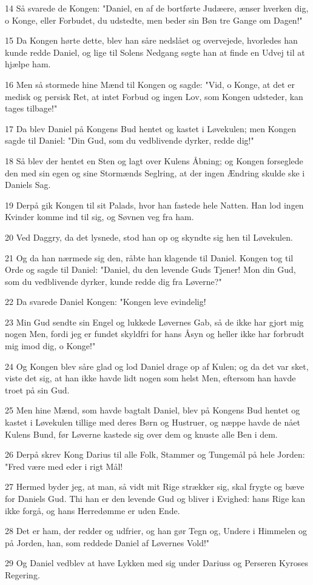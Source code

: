 \par 14 Så svarede de Kongen: "Daniel, en af de bortførte Judæere, ænser hverken dig, o Konge, eller Forbudet, du udstedte, men beder sin Bøn tre Gange om Dagen!"
\par 15 Da Kongen hørte dette, blev han såre nedslået og overvejede, hvorledes han kunde redde Daniel, og lige til Solens Nedgang søgte han at finde en Udvej til at hjælpe ham.
\par 16 Men så stormede hine Mænd til Kongen og sagde: "Vid, o Konge, at det er medisk og persisk Ret, at intet Forbud og ingen Lov, som Kongen udsteder, kan tages tilbage!"
\par 17 Da blev Daniel på Kongens Bud hentet og kastet i Løvekulen; men Kongen sagde til Daniel: "Din Gud, som du vedblivende dyrker, redde dig!"
\par 18 Så blev der hentet en Sten og lagt over Kulens Åbning; og Kongen forseglede den med sin egen og sine Stormænds Seglring, at der ingen Ændring skulde ske i Daniels Sag.
\par 19 Derpå gik Kongen til sit Palads, hvor han fastede hele Natten. Han lod ingen Kvinder komme ind til sig, og Søvnen veg fra ham.
\par 20 Ved Daggry, da det lysnede, stod han op og skyndte sig hen til Løvekulen.
\par 21 Og da han nærmede sig den, råbte han klagende til Daniel. Kongen tog til Orde og sagde til Daniel: "Daniel, du den levende Guds Tjener! Mon din Gud, som du vedblivende dyrker, kunde redde dig fra Løverne?"
\par 22 Da svarede Daniel Kongen: "Kongen leve evindelig!
\par 23 Min Gud sendte sin Engel og lukkede Løvernes Gab, så de ikke har gjort mig nogen Men, fordi jeg er fundet skyldfri for hans Åsyn og heller ikke har forbrudt mig imod dig, o Konge!"
\par 24 Og Kongen blev såre glad og lod Daniel drage op af Kulen; og da det var sket, viste det sig, at han ikke havde lidt nogen som helst Men, eftersom han havde troet på sin Gud.
\par 25 Men hine Mænd, som havde bagtalt Daniel, blev på Kongens Bud hentet og kastet i Løvekulen tillige med deres Børn og Hustruer, og næppe havde de nået Kulens Bund, før Løverne kastede sig over dem og knuste alle Ben i dem.
\par 26 Derpå skrev Kong Darius til alle Folk, Stammer og Tungemål på hele Jorden: "Fred være med eder i rigt Mål!
\par 27 Hermed byder jeg, at man, så vidt mit Rige strækker sig, skal frygte og bæve for Daniels Gud. Thi han er den levende Gud og bliver i Evighed: hans Rige kan ikke forgå, og hans Herredømme er uden Ende.
\par 28 Det er ham, der redder og udfrier, og han gør Tegn og, Undere i Himmelen og på Jorden, han, som reddede Daniel af Løvernes Vold!"
\par 29 Og Daniel vedblev at have Lykken med sig under Dariuss og Perseren Kyroses Regering.

